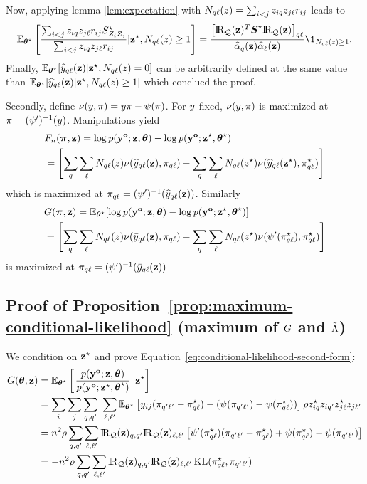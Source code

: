 Now, applying lemma \ref{lem:expectation} with $N_{q\ell}(z) = \sum_{i<j}z_{i q}z_{j\ell}r_{i j}$ leads to
\begin{equation*}
\Esp_{\bthetas}\left[\frac{\sum_{i<j}\ziq\zjl\rrij S_{Z_{i} Z_{j}}^{\star}}{\sum_{i<j}\ziq\zjl\rrij}| \bzs, N_{q\el}(z) \geq 1 \right] = \frac{\left[ \RQbz\transpose \Sal \RQbz \right]_{\kk\el}}{\pizk\pizl} \1_{N_{q\el}(z) \geq 1}.
\end{equation*}
Finally, $\mathbb{E}_{\boldsymbol{\theta}^\star}[\widehat{y}_{q\ell}(\mathbf{z}) | \mathbf{z}^\star, N_{q\ell}(z)=0]$ can be arbitrarily defined at the same value than $\mathbb{E}_{\boldsymbol{\theta}^\star}[\widehat{y}_{q\ell}(\mathbf{z}) | \mathbf{z}^\star, N_{q\ell}(z)\geq1]$ which conclued the proof.

Secondly, define
    $\nu(y, \pi)  = y \pi - \psi (\pi)$. For $y$ fixed, $\nu(y, \pi)$ is maximized at $\pi = (\psi')^{-1}(y)$. Manipulations yield
\begin{align*}
  &\Fn(\bal, \bz)= \log \prob(\byo; \bz,\btheta) - \log {\prob(\byo; \bzs,\bthetas)} \\
  & = \left[ \sum_{\kk} \sum_{\el} N_{q\el}(z) \nu(\hyklz, \alkl)  - \sum_{\kk} \sum_{\el} N_{q\el}(z^\star)\nu(\hykl(\bzs), \alskl) \right]
\end{align*}
which is maximized at $\pi_{q\ell} = (\psi')^{-1}(\widehat{y}_{q\ell}(\mathbf{z}))$. Similarly
\begin{align*}
 & \G(\bal, \bz)  = \Esp_{\bthetas} [ \log \prob(\byo; \bz,\btheta) - \log \prob(\byo; \bzs,\bthetas) ] \\
  & = \left[ \sum_{\kk} \sum_{\el} N_{q\el}(z) \nu(\baryklz, \alkl)  - \sum_{\kk} \sum_{\el} N_{q\el}(z^\star) \nu(\normp(\alskl), \alskl) \right]
\end{align*}
is maximized at $\pi_{q\ell} = (\psi')^{-1}(\bar{y}_{q\ell}(\mathbf{z}))$
\proofend

\subsection{Proof of Proposition~\ref{prop:maximum-conditional-likelihood}  (maximum of $G$ and $\tilde{\Lambda}$)} 

\proofbegin
We condition on $\mathbf{z}^\star$ and prove Equation~\eqref{eq:conditional-likelihood-second-form}:
\begin{align*}
  \G(\btheta, \bz) & = \Esp_{\bthetas} \left[ \left. \frac{\prob(\byo; \bz,\btheta)}{\prob(\byo; \bzs,\bthetas)} \right| \bzs \right] \\
  & = \sum_{\ii} \sum_{\jj} \sum_{\kk,\kp}\ \sum_{\el,\lp} \Esp_{\bthetas}\left[ y_{ij}  (\al_{\kp\lp} - \alskl) - (\norm(\al_{\kp\lp}) - \norm(\alskl)) \right] \rho \z^\vrai_{\ii\kk} \z_{\ii\kp} \z^\vrai_{\jj\el} \z_{\jj\lp} \\
  & = \n^2 \rho \sum_{\kk, \kp} \sum_{\el, \lp}  \RQbz_{\kk,\kp} \RQbz_{\el, \lp} \left[ \normp(\alskl) (\al_{\kp\lp} - \alskl) +  \norm(\alskl) - \norm(\al_{\kp\lp}) \right] \\
  & = - \n^2 \rho \sum_{\kk,\kp} \sum_{\el,\lp} \RQbz_{\kk,\kp} \RQbz_{\el, \lp} \KL(\al^\vrai_{\kk\el}, \al_{\kp\lp})
\end{align*}

